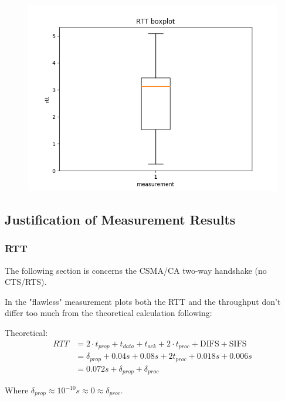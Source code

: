 \documentclass{article}
\begin{document}
\begin{figure}[h] \label{usrp-fails2-5}
	\includegraphics[width=\textwidth]{usrp_fail2_rtt_boxplot}
\end{figure} 

\clearpage

\subsection{Justification of Measurement Results}

\subsubsection{RTT}

The following section is concerns the CSMA/CA two-way handshake (no CTS/RTS).

In the "flawless" measurement plots both the RTT and the throughput don't differ too much from the theoretical calculation following:

Theoretical:
\begin{equation*}
\begin{split}
	RTT & = 2 \cdot t_{prop}+t_{data}+t_{ack}+2\cdot t_{proc}+\text{DIFS}+\text{SIFS} \\
		& = \delta_{prop}+0.04s+0.08s+2t_{proc}+0.018s+0.006s \\
		& = 0.072s + \delta_{prop} + \delta_{proc}
\end{split}
\end{equation*} 

Where $\delta_{prop} \approx 10^{-10}s \approx 0 \approx \delta_{proc}$.
\end{document}
